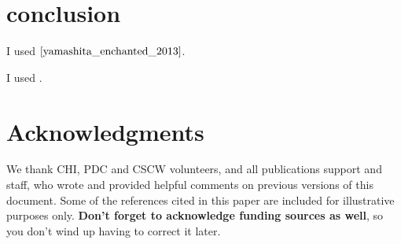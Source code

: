 \documentclass{sigchi}
\begin{document}
\section {conclusion}
I used $\cite{yamashita_enchanted_2013}$.

I used \cite{acrobat}.

\section{Acknowledgments}

We thank CHI, PDC and CSCW volunteers, and all publications support
and staff, who wrote and provided helpful comments on previous
versions of this document.  Some of the references cited in this paper
are included for illustrative purposes only.  \textbf{Don't forget
to acknowledge funding sources as well}, so you don't wind up
having to correct it later.

%
%
%
%
%
\balance



\end{document}
